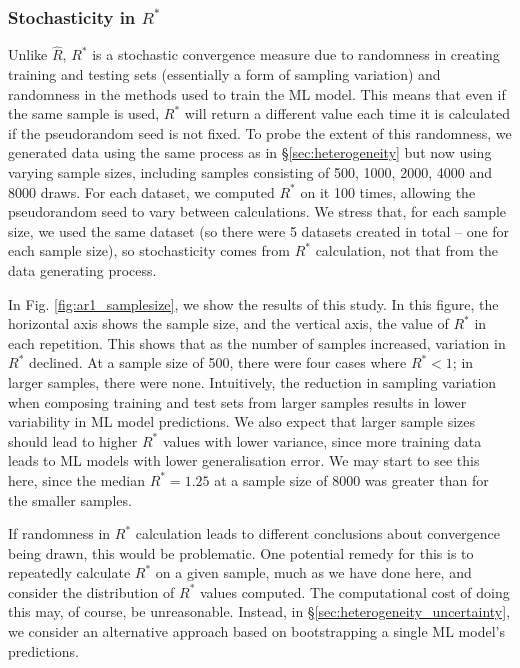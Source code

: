 \documentclass[ba]{imsart}
\numberwithin{equation}{section}
\theoremstyle{plain}
\begin{document}
\subsubsection{Stochasticity in $R^*$}\label{sec:heterogeneity_stochasticity}
Unlike $\widehat{R}$, $R^*$ is a stochastic convergence measure due to randomness in creating training and testing sets (essentially a form of sampling variation) and randomness in the methods used to train the ML model. This means that even if the same sample is used, $R^*$ will return a different value each time it is calculated if the pseudorandom seed is not fixed. To probe the extent of this randomness, we generated data using the same process as in \S\ref{sec:heterogeneity} but now using varying sample sizes, including samples consisting of 500, 1000, 2000, 4000 and 8000 draws. For each dataset, we computed $R^*$ on it 100 times, allowing the pseudorandom seed to vary between calculations. We stress that, for each sample size, we used the same dataset (so there were 5 datasets created in total -- one for each sample size), so stochasticity comes from $R^*$ calculation, not that from the data generating process.

In Fig. \ref{fig:ar1_samplesize}, we show the results of this study. In this figure, the horizontal axis shows the sample size, and the vertical axis, the value of $R^*$ in each repetition. This shows that as the number of samples increased, variation in $R^*$ declined. At a sample size of 500, there were four cases where $R^*<1$; in larger samples, there were none. Intuitively, the reduction in sampling variation when composing training and test sets from larger samples results in lower variability in ML model predictions. We also expect that larger sample sizes should lead to higher $R^*$ values with lower variance, since more training data leads to ML models with lower generalisation error. We may start to see this here, since the median $R^*=1.25$ at a sample size of 8000 was greater than for the smaller samples. 

If randomness in $R^*$ calculation leads to different conclusions about convergence being drawn, this would be problematic. One potential remedy for this is to repeatedly calculate $R^*$ on a given sample, much as we have done here, and consider the distribution of $R^*$ values computed. The computational cost of doing this may, of course, be unreasonable. Instead, in \S\ref{sec:heterogeneity_uncertainty}, we consider an alternative approach based on bootstrapping a single ML model's predictions.
\end{document}
